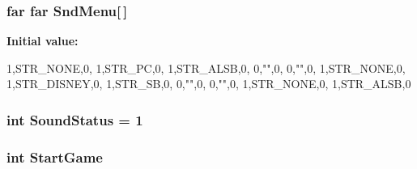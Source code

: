 \label{WL__MENU_8C_a8810a70d8c0aacc1ea82e104825ef35e}
\hypertarget{WL__MENU_8C_a59f90a4c2260476a35128aaffd9a8acb}{
\subsubsection[{SndMenu}]{ far far {\bf SndMenu}\mbox{[}$\,$\mbox{]}}}
\label{WL__MENU_8C_a59f90a4c2260476a35128aaffd9a8acb}
{\bfseries Initial value:}
\begin{DoxyCode}

{














        {1,STR_NONE,0},
        {1,STR_PC,0},
        {1,STR_ALSB,0},
        {0,"",0},
        {0,"",0},
        {1,STR_NONE,0},
        {1,STR_DISNEY,0},
        {1,STR_SB,0},
        {0,"",0},
        {0,"",0},
        {1,STR_NONE,0},
        {1,STR_ALSB,0}

}
\end{DoxyCode}
\hypertarget{WL__MENU_8C_a0564d61a788235ef511758c3922b9927}{
\subsubsection[{SoundStatus}]{\setlength{\rightskip}{0pt plus 5cm}int {\bf SoundStatus} = 1}}
\label{WL__MENU_8C_a0564d61a788235ef511758c3922b9927}
\hypertarget{WL__MENU_8C_a15b7f4ec468d94c3291394639f2fe581}{
\subsubsection[{StartGame}]{\setlength{\rightskip}{0pt plus 5cm}int {\bf StartGame}}}
\label{WL__MENU_8C_a15b7f4ec468d94c3291394639f2fe581}
